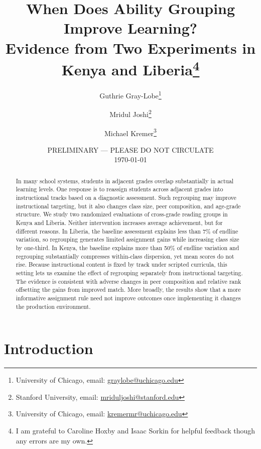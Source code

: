 \documentclass[11pt]{article}
\title{When Does Ability Grouping Improve Learning? \\ Evidence from Two Experiments in Kenya and Liberia\footnote{I am grateful to Caroline Hoxby and Isaac Sorkin for helpful feedback though any errors are my own. } }
\begin{document}
\begin{titlepage}
\author{Guthrie Gray-Lobe\thanks{University of Chicago, email: \protect\href{mailto:graylobe@uchicago.edu}{graylobe@uchicago.edu}} \and Mridul Joshi\thanks{Stanford University, email: \protect\href{mailto:mriduljoshi@stanford.edu}{mriduljoshi@stanford.edu}} \and Michael Kremer\thanks{University of Chicago, email: \protect\href{mailto:kremermr@uchicago.edu}{kremermr@uchicago.edu}}}

\date{PRELIMINARY --- PLEASE DO NOT CIRCULATE \\ \today}
\maketitle

\begin{abstract}\noindent
In many school systems, students in adjacent grades overlap substantially in actual learning levels. One response is to reassign students across adjacent grades into instructional tracks based on a diagnostic assessment. Such regrouping may improve instructional targeting, but it also changes class size, peer composition, and age-grade structure. We study two randomized evaluations of cross-grade reading groups in Kenya and Liberia. Neither intervention increases average achievement, but for different reasons. In Liberia, the baseline assessment explains less than 7\% of endline variation, so regrouping generates limited assignment gains while increasing class size by one-third. In Kenya, the baseline explains more than 50\% of endline variation and regrouping substantially compresses within-class dispersion, yet mean scores do not rise. Because instructional content is fixed by track under scripted curricula, this setting lets us examine the effect of regrouping separately from instructional targeting. The evidence is consistent with adverse changes in peer composition and relative rank offsetting the gains from improved match. More broadly, the results show that a more informative assignment rule need not improve outcomes once implementing it changes the production environment.

\end{abstract}
\setcounter{page}{0}
\thispagestyle{empty}
\end{titlepage}
\doublespacing

\section{Introduction}
\label{sec:intro}
\end{document}
